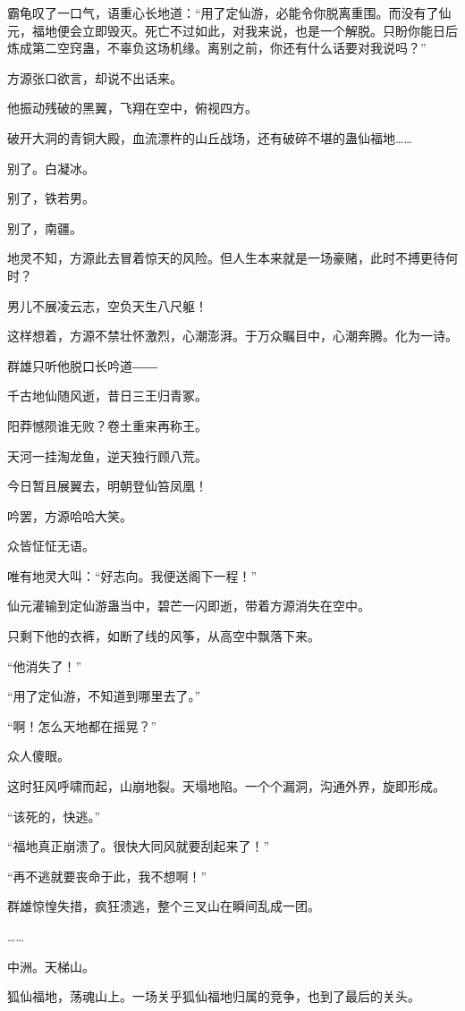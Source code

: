 \begin{this_body}
霸龟叹了一口气，语重心长地道：“用了定仙游，必能令你脱离重围。而没有了仙元，福地便会立即毁灭。死亡不过如此，对我来说，也是一个解脱。只盼你能日后炼成第二空窍蛊，不辜负这场机缘。离别之前，你还有什么话要对我说吗？”

方源张口欲言，却说不出话来。

他振动残破的黑翼，飞翔在空中，俯视四方。

破开大洞的青铜大殿，血流漂杵的山丘战场，还有破碎不堪的蛊仙福地……

别了。白凝冰。

别了，铁若男。

别了，南疆。

地灵不知，方源此去冒着惊天的风险。但人生本来就是一场豪赌，此时不搏更待何时？

男儿不展凌云志，空负天生八尺躯！

这样想着，方源不禁壮怀激烈，心潮澎湃。于万众瞩目中，心潮奔腾。化为一诗。

群雄只听他脱口长吟道――

千古地仙随风逝，昔日三王归青冢。

阳莽憾陨谁无败？卷土重来再称王。

天河一挂淘龙鱼，逆天独行顾八荒。

今日暂且展翼去，明朝登仙笞凤凰！

吟罢，方源哈哈大笑。

众皆怔怔无语。

唯有地灵大叫：“好志向。我便送阁下一程！”

仙元灌输到定仙游蛊当中，碧芒一闪即逝，带着方源消失在空中。

只剩下他的衣裤，如断了线的风筝，从高空中飘落下来。

“他消失了！”

“用了定仙游，不知道到哪里去了。”

“啊！怎么天地都在摇晃？”

众人傻眼。

这时狂风呼啸而起，山崩地裂。天塌地陷。一个个漏洞，沟通外界，旋即形成。

“该死的，快逃。”

“福地真正崩溃了。很快大同风就要刮起来了！”

“再不逃就要丧命于此，我不想啊！”

群雄惊惶失措，疯狂溃逃，整个三叉山在瞬间乱成一团。

……

中洲。天梯山。

狐仙福地，荡魂山上。一场关乎狐仙福地归属的竞争，也到了最后的关头。


\end{this_body}
